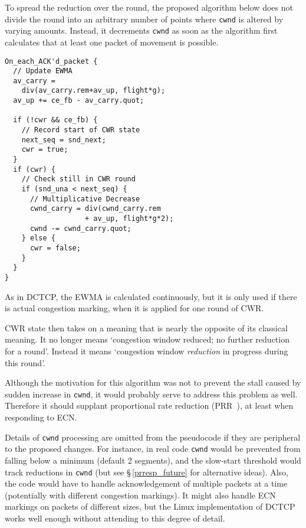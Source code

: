 To spread the reduction over the round, the proposed algorithm below does not
divide the round into an arbitrary number of points where \texttt{cwnd} is
altered by varying amounts. Instead, it decrements \texttt{cwnd} as soon as the
algorithm first calculates that at least one packet of movement is possible. 

\begin{verbatim}
On_each_ACK'd_packet {
  // Update EWMA
  av_carry = 
    div(av_carry.rem+av_up, flight*g);
  av_up += ce_fb - av_carry.quot;

  if (!cwr && ce_fb) {
    // Record start of CWR state
    next_seq = snd_next;
    cwr = true;
  }
  if (cwr) {
    // Check still in CWR round
    if (snd_una < next_seq) {
      // Multiplicative Decrease
      cwnd_carry = div(cwnd_carry.rem 
                   + av_up, flight*g*2);
      cwnd -= cwnd_carry.quot;
    } else {
      cwr = false;
    }
  }
}
\end{verbatim}

As in DCTCP, the EWMA is calculated continuously, but it is only used if there
is actual congestion marking, when it is applied for one round of CWR. %

CWR state then takes on a meaning that is nearly the opposite of its classical
meaning. It no longer means `congestion window reduced; no further reduction for
a round'. Instead it means `congestion window \emph{reduction} in progress
during this round'. 

Although the motivation for this algorithm was not to prevent the stall caused
by sudden increase in \texttt{cwnd}, it would probably serve to address this
problem as well. Therefore it should supplant proportional rate reduction
(PRR~\cite{IETF_RFC6937:PRR}), at least when responding to ECN.

Details of \texttt{cwnd} processing are omitted from the pseudocode if they are
peripheral to the proposed changes. For instance, in real code \texttt{cwnd}
would be prevented from falling below a minimum (default 2 segments), and the
slow-start threshold would track reductions in \texttt{cwnd} (but see
\S\,\ref{prresp_future} for alternative ideas). Also, the code would have to
handle acknowledgement of multiple packets at a time (potentially with different
congestion markings). It might also handle ECN markings on packets of different
sizes, but the Linux implementation of DCTCP works well enough without attending
to this degree of detail.


